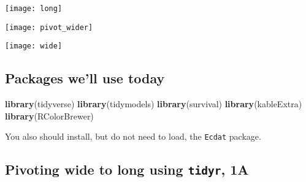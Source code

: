 \documentclass[
  11pt,
]{article}
\newenvironment{Shaded}{\begin{snugshade}}{\end{snugshade}}
\newcommand{\FunctionTok}[1]{\textcolor[rgb]{0.13,0.29,0.53}{\textbf{#1}}}
\newcommand{\NormalTok}[1]{#1}
\begin{document}
\begin{cols}

\begin{col}{0.32\textwidth}
\texttt{[image: long]}

\end{col}

\begin{col}{0.01\textwidth}

\vspace{1ex}

\end{col}

\begin{col}{0.32\textwidth}
\texttt{[image: pivot\_wider]}

\end{col}

\begin{col}{0.01\textwidth}

\vspace{1ex}

\end{col}

\begin{col}{0.32\textwidth}
\texttt{[image: wide]}

\end{col}

\end{cols}

\hypertarget{packages-well-use-today}{%
\subsection{Packages we'll use today}\label{packages-well-use-today}}

\begin{Shaded}
\begin{Highlighting}[]
\FunctionTok{library}\NormalTok{(tidyverse)}
\FunctionTok{library}\NormalTok{(tidymodels)}
\FunctionTok{library}\NormalTok{(survival)}
\FunctionTok{library}\NormalTok{(kableExtra)}
\FunctionTok{library}\NormalTok{(RColorBrewer)}
\end{Highlighting}
\end{Shaded}

You also should install, but do not need to load, the \texttt{Ecdat}
package.

\hypertarget{pivoting-wide-to-long-using-tidyr-1a}{%
\subsection{\texorpdfstring{Pivoting wide to long using \texttt{tidyr},
1A}{Pivoting wide to long using tidyr, 1A}}\label{pivoting-wide-to-long-using-tidyr-1a}}
\end{document}
